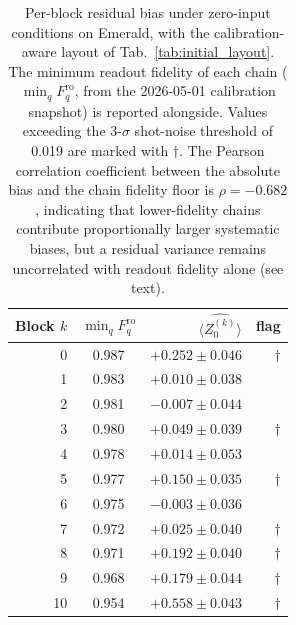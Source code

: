 \begin{table}[h]
\centering
\caption{Per-block residual bias under zero-input conditions on Emerald, with the calibration-aware layout of Tab.~\ref{tab:initial_layout}. The minimum readout fidelity of each chain ($\min_q F^{\mathrm{ro}}_q$, from the 2026-05-01 calibration snapshot) is reported alongside. Values exceeding the 3-$\sigma$ shot-noise threshold of 0.019 are marked with $\dagger$. The Pearson correlation coefficient between the absolute bias and the chain fidelity floor is $\rho=-0.682$, indicating that lower-fidelity chains contribute proportionally larger systematic biases, but a residual variance remains uncorrelated with readout fidelity alone (see text).}
\label{tab:per_block_bias}
\begin{tabular}{rcrr}
\toprule
Block $k$ & $\min_q F^{\mathrm{ro}}_q$ & $\widehat{\langle Z_0^{(k)}\rangle}$ & flag \\
\midrule
0  & 0.987 & $+0.252 \pm 0.046$ & $\dagger$ \\
1  & 0.983 & $+0.010 \pm 0.038$ & \\
2  & 0.981 & $-0.007 \pm 0.044$ & \\
3  & 0.980 & $+0.049 \pm 0.039$ & $\dagger$ \\
4  & 0.978 & $+0.014 \pm 0.053$ & \\
5  & 0.977 & $+0.150 \pm 0.035$ & $\dagger$ \\
6  & 0.975 & $-0.003 \pm 0.036$ & \\
7  & 0.972 & $+0.025 \pm 0.040$ & $\dagger$ \\
8  & 0.971 & $+0.192 \pm 0.040$ & $\dagger$ \\
9  & 0.968 & $+0.179 \pm 0.044$ & $\dagger$ \\
10 & 0.954 & $+0.558 \pm 0.043$ & $\dagger$ \\
\bottomrule
\end{tabular}
\end{table}

